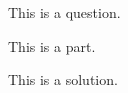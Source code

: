 \begin{question}
  This is a question.
\end{question}

\begin{parts}

  \begin{part}
    This is a part.
  \end{part}

  \begin{solution}
    This is a solution.
  \end{solution}

\end{parts}
